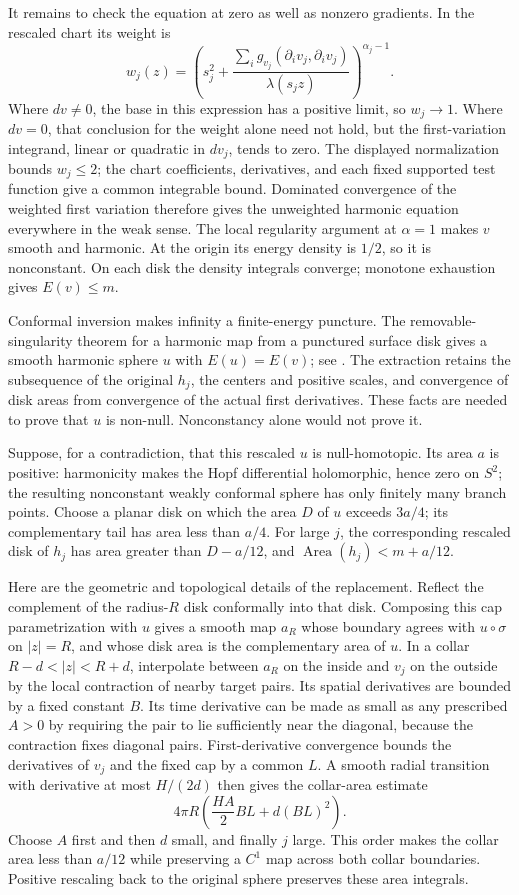 It remains to check the equation at zero as well as nonzero
gradients. In the rescaled chart its weight is
\[
 w_j(z)=\left(s_j^2+
 \frac{\sum_i g_{v_j}(\partial_i v_j,\partial_i v_j)}
      {\lambda(s_jz)}\right)^{\alpha_j-1}.
\]
Where $dv\ne0$, the base in this expression has a positive limit,
so $w_j\to1$. Where $dv=0$, that conclusion for the weight alone
need not hold, but the first-variation integrand, linear or
quadratic in $dv_j$, tends to zero. The displayed normalization
bounds $w_j\leq2$; the chart coefficients, derivatives, and each
fixed supported test function give a common integrable bound.
Dominated convergence of the weighted first variation therefore
gives the unweighted harmonic equation everywhere in the weak
sense. The local regularity argument at $\alpha=1$ makes $v$
smooth and harmonic. At the origin its energy density is $1/2$,
so it is nonconstant. On each disk the density integrals converge;
monotone exhaustion gives $E(v)\leq m$.

Conformal inversion makes infinity a finite-energy puncture.
The removable-singularity theorem for a harmonic map from a
punctured surface disk gives a smooth harmonic sphere $u$ with
$E(u)=E(v)$; see
\cite[Theorem 3.6, pp.~13--15]{SacksUhlenbeck1981}.
The extraction retains the subsequence of the original $h_j$,
the centers and positive scales, and convergence of disk areas
from convergence of the actual first derivatives. These facts
are needed to prove that $u$ is non-null. Nonconstancy alone
would not prove it.

Suppose, for a contradiction, that this rescaled $u$ is null-homotopic.
Its area $a$ is positive: harmonicity makes the Hopf differential
holomorphic, hence zero on $S^2$; the resulting nonconstant weakly
conformal sphere has only finitely many branch points. Choose a planar
disk on which the area $D$ of $u$ exceeds $3a/4$; its complementary
tail has area less than $a/4$. For large $j$, the corresponding rescaled
disk of $h_j$ has area greater than $D-a/12$, and
$\operatorname{Area}(h_j)<m+a/12$.

Here are the geometric and topological details of the replacement.
Reflect the complement of the radius-$R$ disk conformally into that
disk. Composing this cap parametrization with $u$ gives a smooth
map $a_R$ whose boundary agrees with $u\circ\sigma$ on $|z|=R$,
and whose disk area is the complementary area of $u$.
In a collar $R-d<|z|<R+d$, interpolate between $a_R$ on the
inside and $v_j$ on the outside by the local contraction of nearby
target pairs. Its spatial derivatives are bounded by a fixed
constant $B$. Its time derivative can be made as small as any
prescribed $A>0$ by requiring the pair to lie sufficiently near
the diagonal, because the contraction fixes diagonal pairs.
First-derivative convergence bounds the derivatives of $v_j$ and
the fixed cap by a common $L$. A smooth radial transition with
derivative at most $H/(2d)$ then gives the collar-area estimate
\[
 4\pi R\left(\frac{HA}{2}BL+d(BL)^2\right).
\]
Choose $A$ first and then $d$ small, and finally $j$ large. This
order makes the collar area less than $a/12$ while preserving a
$C^1$ map across both collar boundaries. Positive rescaling back
to the original sphere preserves these area integrals.

